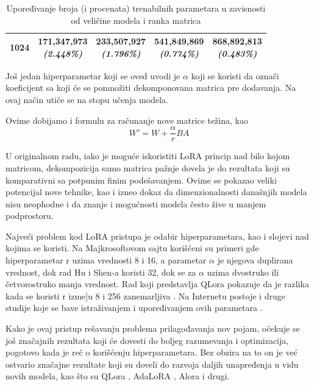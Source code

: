 \documentclass[12pt,oneside]{memoir}
\begin{document}
\begin{table}[h!]
\begin{tabular}{|c|c|c|c|c|}
		\hline
		1024 & \makecell{171,347,973 \\ \textit{(2.448\%)}} & \makecell{233,507,927 \\ \textit{(1.796\%)}} & \makecell{541,849,869 \\ \textit{(0.774\%)}} & \makecell{868,892,813 \\ \textit{(0.483\%)}} \\ 
		\hline
	\end{tabular}
	\caption{Upoređivanje broja (i procenata) trenabilnih parametara u zavisnosti od veličine modela i ranka matrica}
	\label{tab:LoRARank}
\end{table}

Još jedan hiperparametar koji se oved uvodi je \(\alpha\) koji se koristi da označi koeficijent sa koji će se pomnožiti dekomponovana matrica pre dodavanja. Na ovaj način utiče se na stopu učenja modela. 

Ovime dobijamo i formulu za računanje nove matrice težina, kao 
\begin{equation}
	W' = W + \frac{\alpha}{r} BA
\end{equation}

U originalnom radu, iako je moguće iskoristiti LoRA princip nad bilo kojom matricom, dekompozicija samo matrica pažnje dovela je do rezultata koji su komparativni sa potpunim finim podešavanjem. Ovime se pokazao veliki potencijal nove tehnike, kao i izneo dokaz da dimenzionalnosti današnjih modela nisu neophodne i da znanje i mogućnosti modela često žive u manjem podprostoru.

Najveći problem kod LoRA pristupa je odabir hiperparametara, kao i slojevi nad kojima se koristi. Na Majkrosoftovom sajtu korišćeni su primeri gde hiperparametar r uzima vrednosti 8 i 16, a parametar \(\alpha\) je njegova duplirana vrednost\cite{microsoft_lora}, dok rad Hu i Shen-a koristi 32, dok se za \(\alpha\) uzima dvostruko ili četvorostruko manja vrednost. Rad koji predstavlja QLora pokazuje da je razlika kada se koristi r izme]u 8 i 256 zanemarljiva \cite{2023dettmersQLora}. Na Internetu postoje i druge studije koje se bave istraživanjem i upoređivanjem ovih parametara \cite{unsloth_lora}.

Kako je ovaj pristup rešavanju problema prilagođavanja nov pojam, očekuje se još značajnih rezultata koji će dovesti do boljeg razumevanja i optimizacija, pogotovo kada je reč o korišćenju hiperparametara. Bez obzira na to on je već ostvario značajne rezultate koji su doveli do razvoja daljih unapređenja u vidu novih modela, kao što su QLora \cite{2023dettmersQLora}, AdaLoRA \cite{zhang2023adalora}, Alora \cite{liu2024alora} i drugi.
\end{document}
